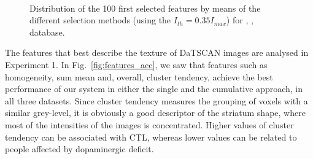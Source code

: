 \begin{figure}[ht]
	\centering
	\\
	
	\caption[Distribution of the 100 first selected features by means of the different selection methods.]{Distribution of the 100 first selected features by means of the different selection methods (using the $I_{th} = 0.35 I_{max}$) for \ppmidat{}, \vdlndat{}, \vdlvdat{} database.} 
	\label{fig:fnumber}
\end{figure}

The features that best describe the texture of DaTSCAN images are analysed in Experiment 1. In Fig.~\ref{fig:features_acc}, we saw that features such as homogeneity, sum mean and, overall, cluster tendency, achieve the best performance of our system in either the single and the cumulative approach, in all three datasets. Since cluster tendency measures the grouping of voxels with a similar grey-level, it is obviously a good descriptor of the striatum shape, where most of the intensities of the images is concentrated. Higher values of cluster tendency can be associated with \ac{CTL}, whereas lower values can be related to people affected by dopaminergic deficit. 

